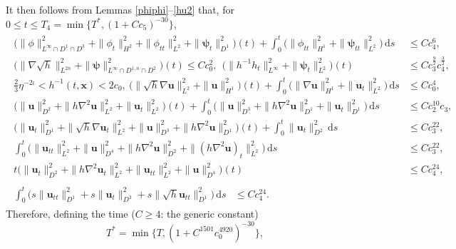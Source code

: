 \documentclass[11pt,reqno]{amsart}
\numberwithin{rk}{section}
\numberwithin{prop}{section}
\numberwithin{mydef}{section}
\numberwithin{lem}{section}
\numberwithin{equation}{section}
\numberwithin{thm}{section}
\begin{document}
It then  follows from Lemmas \ref{phiphi}--\ref{hu2} that, for $0\leq t\leq T_4=\min\{T^*,(1+Cc_5)^{-30}\}$,
\begin{align*}
\begin{aligned}
\big(\|\phi\|^2_{L^\infty\cap D^1\cap D^3}+\|\phi_t\|^2_{H^2}+
\|\phi_{tt}\|^2_{L^2}+\|\boldsymbol{\psi}_t\|^2_{D^1}\big)(t)+\int^t_0\big(\|\phi_{tt}\|^2_{H^1}+\|\boldsymbol{\psi}_{tt}\|^2_{L^2}\big)\,\mathrm{d}s&\leq Cc_4^6,\\
\big(\|\nabla\sqrt{h}\|^2_{L^{2n}}+
\|\boldsymbol{\psi}\|^2_{L^\infty\cap D^{1,n}\cap D^2}\big)(t)\leq Cc^2_0,\ \ \big(\|h^{-1}h_t\|_{L^\infty}^2+
\|\boldsymbol{\psi}_t\|^2_{L^2}\big)(t)&\leq 
Cc_3^{\frac{9}{2}}c^{\frac{3}{2}}_4,\\
\frac{2}{3}\eta^{-2\iota}<h^{-1}(t,\boldsymbol{x})<2c_0, \  
\big(\|\sqrt{h}\nabla \boldsymbol{u}\|^2_{L^2}+\|\boldsymbol{u}\|^2_{H^1}\big)(t)+\int^t_0\big(\|\nabla \boldsymbol{u}\|^2_{H^1}+\|\boldsymbol{u}_t\|^2_{L^2}\big)\,\mathrm{d}s
&\leq  Cc^4_0,\\
\big(\|\boldsymbol{u}\|_{D^2}^2+\|h\nabla^2\boldsymbol{u}\|^2_{L^2}+\|\boldsymbol{u}_t\|^2_{L^2}\big)(t)+\int^t_0\big(\|\boldsymbol{u}\|^2_{D^3}+\|h\nabla^2\boldsymbol{u}\|_{D^1}^2+\|\boldsymbol{u}_t\|^2_{D^1}\big)\,\mathrm{d}s&\leq  Cc_2^{10}c_3,\\
\big(\|\boldsymbol{u}_t\|^2_{D^1}+\|\sqrt{h}\nabla \boldsymbol{u}_t\|^2_{L^2}+\|\boldsymbol{u}\|^2_{D^3}+\|h\nabla^2\boldsymbol{u}\|^2_{D^1}\big)(t)+\int^t_0\|\boldsymbol{u}_t\|^2_{D^2}\,\mathrm{d}s&\leq   Cc^{22}_3,\\
\int^t_0\big(\|\boldsymbol{u}_{tt}\|^2_{L^2}+\|\boldsymbol{u}\|^2_{D^4}+\|h\nabla^2\boldsymbol{u}\|^2_{D^2}+\|(h\nabla^2\boldsymbol{u})_t\|^2_{L^2}\big)\,\mathrm{d}s&\leq Cc^{22}_3,\\
t\big(\|\boldsymbol{u}_t\|^2_{D^2}+\|h\nabla^2\boldsymbol{u}_t\|^2_{L^2}+\|\boldsymbol{u}_{tt}\|^2_{L^2}+\|\boldsymbol{u}\|^2_{D^4}\big)(t) &\leq  Cc^{24}_4,
\end{aligned}\\
\begin{aligned}
\int^t_0\big(s\|\boldsymbol{u}_{tt}\|_{D^1}^2+s\|\boldsymbol{u}_t\|^2_{D^3}+s\|\sqrt{h} \boldsymbol{u}_{tt}\|_{D^1}^2\big)\,\mathrm{d}s  &\leq  Cc^{24}_4.
\end{aligned}
\end{align*}
Therefore, defining the time ($C\geq 4$: the generic constant)
\begin{equation*} 
T^*=
\min\{T,(1+C^{1501}c^{4920}_0)^{-30}\},
\end{equation*}
\end{document}
